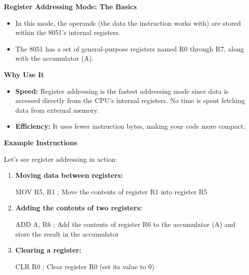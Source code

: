 \documentclass[
]{article}
\newenvironment{Shaded}{}{}
\newcommand{\NormalTok}[1]{#1}
\begin{document}
\textbf{Register Addressing Mode: The Basics}

\begin{itemize}
\item
  In this mode, the operands (the data the instruction works with) are
  stored within the 8051's internal registers.
\item
  The 8051 has a set of general-purpose registers named R0 through R7,
  along with the accumulator (A).
\end{itemize}

\textbf{Why Use It}

\begin{itemize}
\item
  \textbf{Speed:} Register addressing is the fastest addressing mode
  since data is accessed directly from the CPU's internal registers. No
  time is spent fetching data from external memory.
\item
  \textbf{Efficiency:} It uses fewer instruction bytes, making your code
  more compact.
\end{itemize}

\textbf{Example Instructions}

Let's see register addressing in action:

\begin{enumerate}
\def\labelenumi{\arabic{enumi}.}
\item
  \textbf{Moving data between registers:}

\begin{Shaded}
\begin{Highlighting}[]
\NormalTok{MOV R5, R1  ; Move the contents of register R1 into register R5}
\end{Highlighting}
\end{Shaded}
\item
  \textbf{Adding the contents of two registers:}

\begin{Shaded}
\begin{Highlighting}[]
\NormalTok{ADD A, R6   ; Add the contents of register R6 to the accumulator (A) and store the result in the accumulator}
\end{Highlighting}
\end{Shaded}
\item
  \textbf{Clearing a register:}

\begin{Shaded}
\begin{Highlighting}[]
\NormalTok{CLR R0      ; Clear register R0 (set its value to 0)}
\end{Highlighting}
\end{Shaded}
\end{enumerate}
\end{document}
